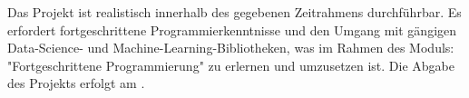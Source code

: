 Das Projekt ist realistisch innerhalb des gegebenen Zeitrahmens durchführbar.
Es erfordert fortgeschrittene Programmierkenntnisse und den Umgang mit gängigen Data-Science- und Machine-Learning-Bibliotheken, was im Rahmen des Moduls:
\\
"Fortgeschrittene Programmierung" zu erlernen und umzusetzen ist.
Die Abgabe des Projekts erfolgt am \submissionDate.